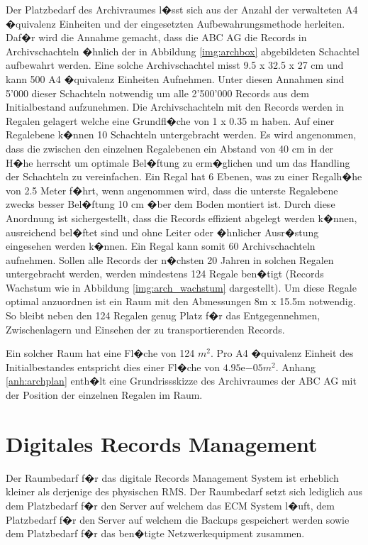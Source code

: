 \documentclass[a4paper,twoside,10pt]{report}
\begin{document}
Der Platzbedarf des Archivraumes l�sst sich aus der Anzahl der verwalteten A4 �quivalenz Einheiten und der eingesetzten Aufbewahrungsmethode herleiten. Daf�r wird die Annahme gemacht, dass die ABC AG die Records in Archivschachteln �hnlich der in Abbildung \ref{img:archbox} abgebildeten Schachtel aufbewahrt werden. Eine solche Archivschachtel misst 9.5 x 32.5 x 27 cm und kann 500 A4 �quivalenz Einheiten Aufnehmen. Unter diesen Annahmen sind 5'000 dieser Schachteln notwendig um alle 2'500'000 Records aus dem Initialbestand aufzunehmen. Die Archivschachteln mit den Records werden in Regalen gelagert welche eine Grundfl�che von 1 x 0.35 m haben. Auf einer Regalebene k�nnen 10 Schachteln untergebracht werden. Es wird angenommen, dass die zwischen den einzelnen Regalebenen ein Abstand von 40 cm in der H�he herrscht um optimale Bel�ftung zu erm�glichen und um das Handling der Schachteln zu vereinfachen. Ein Regal hat 6 Ebenen, was zu einer Regalh�he von 2.5 Meter f�hrt, wenn angenommen wird, dass die unterste Regalebene zwecks besser Bel�ftung 10 cm �ber dem Boden montiert ist. Durch diese Anordnung ist sichergestellt, dass die Records effizient abgelegt werden k�nnen, ausreichend bel�ftet sind und ohne Leiter oder �hnlicher Ausr�stung eingesehen werden k�nnen. Ein Regal kann somit 60 Archivschachteln aufnehmen. Sollen alle Records der n�chsten 20 Jahren in solchen Regalen untergebracht werden, werden mindestens 124 Regale ben�tigt (Records Wachstum wie in Abbildung \ref{img:arch_wachstum} dargestellt). Um diese Regale optimal anzuordnen ist ein Raum mit den Abmessungen 8m x 15.5m notwendig. So bleibt neben den 124 Regalen genug Platz f�r das Entgegennehmen, Zwischenlagern und Einsehen der zu transportierenden Records. 

Ein solcher Raum hat eine Fl�che von 124 $m^2$. Pro A4 �quivalenz Einheit des Initialbestandes entspricht dies einer Fl�che von $4.95\mathrm{e}{-05} m^2$.  Anhang \ref{anh:archplan} enth�lt eine Grundrissskizze des Archivraumes der ABC AG mit der Position der einzelnen Regalen im Raum. 

\section{Digitales Records Management}\label{subsec:raum_digi}
Der Raumbedarf f�r das digitale Records Management System ist erheblich kleiner als derjenige des physischen \ac{RMS}. Der Raumbedarf setzt sich lediglich aus dem Platzbedarf f�r den Server auf welchem das \ac{ECM} System l�uft, dem Platzbedarf f�r den Server auf welchem die Backups gespeichert werden sowie dem Platzbedarf f�r das ben�tigte Netzwerkequipment zusammen.
\end{document}

